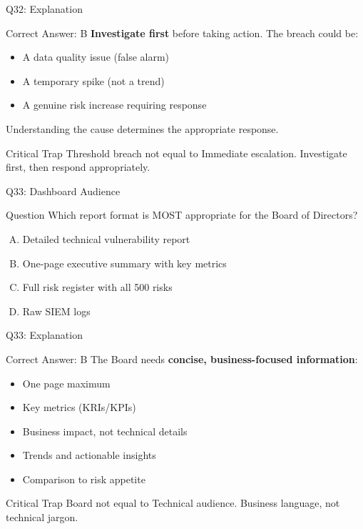 \documentclass{beamer}
\begin{document}
	\begin{frame}{Q32: Explanation}
		\begin{block}{Correct Answer: B}
			\textbf{Investigate first} before taking action. The breach could be:
			\begin{itemize}
				\item A data quality issue (false alarm)
				\item A temporary spike (not a trend)
				\item A genuine risk increase requiring response
			\end{itemize}
			Understanding the cause determines the appropriate response.
		\end{block}
		\begin{alertblock}{Critical Trap}
			Threshold breach not equal to Immediate escalation.
			Investigate first, then respond appropriately.
		\end{alertblock}
	\end{frame}
	
	\begin{frame}{Q33: Dashboard Audience}
		\begin{block}{Question}
			Which report format is MOST appropriate for the Board of Directors?
		\end{block}
		\begin{enumerate}[(A)]
			\item Detailed technical vulnerability report
			\item One-page executive summary with key metrics
			\item Full risk register with all 500 risks
			\item Raw SIEM logs
		\end{enumerate}
	\end{frame}
	
	\begin{frame}{Q33: Explanation}
		\begin{block}{Correct Answer: B}
			The Board needs \textbf{concise, business-focused information}:
			\begin{itemize}
				\item One page maximum
				\item Key metrics (KRIs/KPIs)
				\item Business impact, not technical details
				\item Trends and actionable insights
				\item Comparison to risk appetite
			\end{itemize}
		\end{block}
		\begin{alertblock}{Critical Trap}
			Board not equal to Technical audience.
			Business language, not technical jargon.
		\end{alertblock}
	\end{frame}
	
\end{document}
